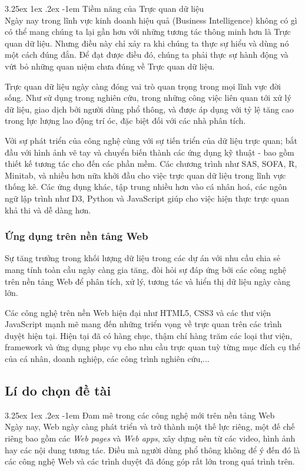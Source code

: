 \documentclass[12pt,a4paper]{article}
\makeatletter
\newcommand{\myparagraph}[1]{\paragraph{#1}\mbox{}\\} %
\renewcommand\paragraph{\@startsection{paragraph}{5}{\z@}%
  {3.25ex \@plus1ex \@minus.2ex}%
  {-1em}%
  {\normalfont\normalsize\bfseries}}
\makeatother
\begin{document}
\myparagraph{Tiềm năng của Trực quan dữ liệu}
Ngày nay trong lĩnh vực kinh doanh hiệu quả (Business Intelligence) không có gì có thể mang chúng ta lại gần hơn với những tương tác thông minh hơn là Trực quan dữ liệu. Nhưng điều này chỉ xảy ra khi chúng ta thực sự hiểu và dùng nó một cách đúng đắn. Để đạt được điều đó, chúng ta phải thực sự hành động và vứt bỏ những quan niệm chưa đúng về Trực quan dữ liệu.

Trực quan dữ liệu ngày càng đóng vai trò quan trọng trong mọi lĩnh vực đời sống. Như sử dụng trong nghiên cứu, trong những công việc liên quan tới xử lý dữ liệu, giao dịch bởi người dùng phổ thông, và được áp dụng với tỷ lệ tăng cao trong lực lượng lao động trí óc, đặc biệt đối với các nhà phân tích.

Với sự phát triển của công nghệ cùng với sự tiến triển của dữ liệu trực quan; bắt đầu với hình ảnh vẽ tay và chuyển biến thành các ứng dụng kỹ thuật - bao gồm thiết kế tương tác cho đến các phần mềm. \cite{wiki_history_2} Các chương trình như SAS, SOFA, R, Minitab, và nhiều hơn nữa khởi đầu cho việc trực quan dữ liệu trong lĩnh vực thống kê. Các ứng dụng khác, tập trung nhiều hơn vào cá nhân hoá, các ngôn ngữ lập trình như D3, Python và JavaScript giúp cho việc hiện thực trực quan khả thi và dễ dàng hơn.

\subsubsection{Ứng dụng trên nền tảng Web}
Sự tăng trưởng trong khối lượng dữ liệu trong các dự án với nhu cầu chia sẻ mang tính toàn cầu ngày càng gia tăng, đòi hỏi sự đáp ứng bởi các công nghệ trên nền tảng Web để phân tích, xử lý, tương tác và hiển thị dữ liệu ngày càng lớn. 

Các công nghệ trên nền Web hiện đại như HTML5, CSS3 và các thư viện JavaScript mạnh mẽ mang đến những triển vọng về trực quan trên các trình duyệt hiện tại. Hiện tại đã có hàng chục, thậm chí hàng trăm các loại thư viện, framework và ứng dụng phục vụ cho nhu cầu trực quan tuỳ từng mục đích cụ thể của cá nhân, doanh nghiệp, các công trình nghiên cứu,...

\subsection{Lí do chọn đề tài}
\myparagraph{Đam mê trong các công nghệ mới trên nền tảng Web}
Ngày nay, \cite{web_evolution} Web ngày càng phát triển và trở thành một thế lực riêng, một đế chế riêng bao gồm các \textit{Web pages} và \textit{Web apps}, xây dựng nên từ các video, hình ảnh hay các nội dung tương tác. Điều mà người dùng phổ thông không để ý đến đó là các công nghệ Web và các trình duyệt đã đóng góp rất lớn trong quá trình trên.
\end{document}

